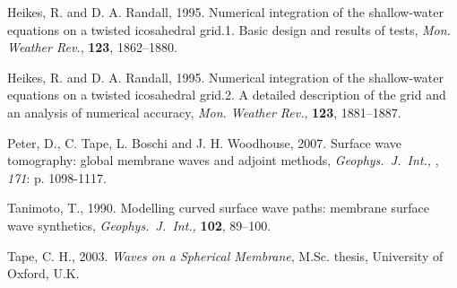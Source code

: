 \documentclass[a4paper,
                          headsepline,
                          listof=totoc,
                          toc=listof,
                          headings=small]{scrreprt} %
\newcommand{\gji}{\textit{Geophys.\ J.\ Int.,} }
\begin{document}
%
\begin{thebibliography}{Bibliography}

 Heikes, R. and D. A. Randall, 1995. 
{Numerical integration of the shallow-water equations on a twisted icosahedral grid.1. 
Basic design and results of tests}, \textit{Mon. Weather Rev.}, \textbf{123}, 1862--1880.

 Heikes, R. and D. A. Randall, 1995. 
{Numerical integration of the shallow-water equations on a twisted icosahedral grid.2. 
A detailed description of the grid and an analysis of numerical accuracy}, 
\textit{Mon. Weather Rev.}, \textbf{123}, 1881--1887. 

 Peter, D., C. Tape, L. Boschi and J. H. Woodhouse, 2007. Surface wave tomography: global membrane waves and adjoint methods, \textit{\gji}, \textit{171}: p. 1098-1117.

 Tanimoto, T., 1990. 
{Modelling curved surface wave paths: membrane surface wave synthetics}, \gji \textbf{102}, 89--100.

 Tape, C. H., 2003. 
\textit{Waves on a Spherical Membrane}, M.Sc. thesis, University of Oxford, U.K.

\end{thebibliography}


\end{document}
